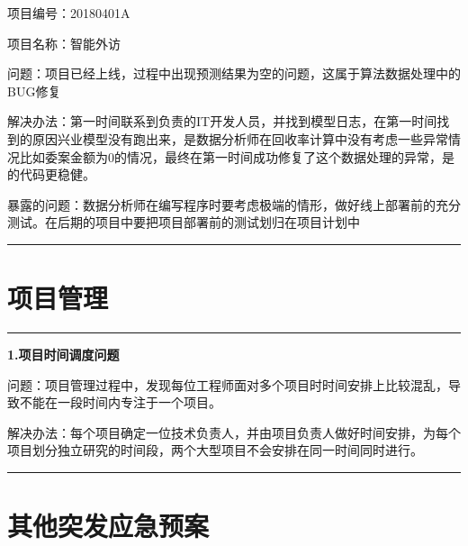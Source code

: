 \documentclass[]{book}
\begin{document}
项目编号：20180401A

项目名称：智能外访

问题：项目已经上线，过程中出现预测结果为空的问题，这属于算法数据处理中的BUG修复

解决办法：第一时间联系到负责的IT开发人员，并找到模型日志，在第一时间找到的原因兴业模型没有跑出来，是数据分析师在回收率计算中没有考虑一些异常情况比如委案金额为0的情况，最终在第一时间成功修复了这个数据处理的异常，是的代码更稳健。

暴露的问题：数据分析师在编写程序时要考虑极端的情形，做好线上部署前的充分测试。在后期的项目中要把项目部署前的测试划归在项目计划中

\begin{center}\rule{0.5\linewidth}{\linethickness}\end{center}

\chapter{项目管理}\label{ux7ba1ux7406}

\begin{center}\rule{0.5\linewidth}{\linethickness}\end{center}

\textbf{1.项目时间调度问题}

问题：项目管理过程中，发现每位工程师面对多个项目时时间安排上比较混乱，导致不能在一段时间内专注于一个项目。

解决办法：每个项目确定一位技术负责人，并由项目负责人做好时间安排，为每个项目划分独立研究的时间段，两个大型项目不会安排在同一时间同时进行。

\begin{center}\rule{0.5\linewidth}{\linethickness}\end{center}

\chapter{其他突发应急预案}\label{ux5176ux4ed6}


\end{document}
